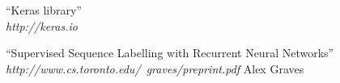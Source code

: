 \documentclass[twoside]{article}
\begin{document}
\begin{multicols}{2}
\begin{thebibliography}{99}
    ``Keras library'' \\
\emph{http://keras.io}

    ``Supervised Sequence Labelling with Recurrent Neural Networks''	\\	\emph{http://www.cs.toronto.edu/~graves/preprint.pdf} 
    Alex Graves

\end{thebibliography}


\end{multicols}
\end{document}
